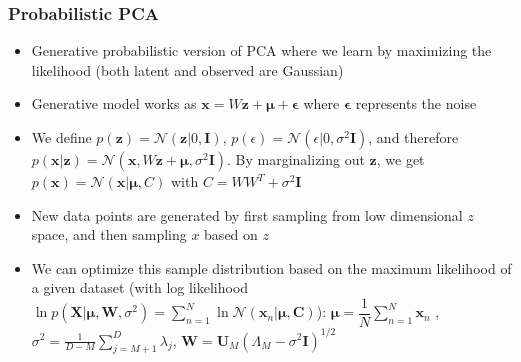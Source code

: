 \subsubsection{Probabilistic PCA}
\begin{itemize}
	\item Generative probabilistic version of PCA where we learn by maximizing the likelihood (both latent and observed are Gaussian)
	\item Generative model works as $\bm{x} = W\bm{z} + \bm{\mu} + \bm{\epsilon}$ where $\bm{\epsilon}$ represents the noise
	\item We define $p(\bm{z}) = \mathcal{N}(\bm{z}|0, \bm{I})$, $p(\epsilon) = \mathcal{N}(\epsilon|0, \sigma^2 \bm{I})$, and therefore $p(\bm{x}|\bm{z}) = \mathcal{N}(\bm{x}, W\bm{z} + \bm{\mu}, \sigma^2 \bm{I})$. By marginalizing out $\bm{z}$, we get $p(\bm{x}) = \mathcal{N}(\bm{x}|\bm{\mu}, C)$ with $C = WW^T + \sigma^2 \bm{I}$
	\item New data points are generated by first sampling from low dimensional $z$ space, and then sampling $x$ based on $z$
	\item We can optimize this sample distribution based on the maximum likelihood of a given dataset (with log likelihood $\ln p(\bm{X}|\bm{\mu},\bm{W},\sigma^2) = \sum_{n=1}^{N} \ln \mathcal{N}(\bm{x}_n|\bm{\mu},\bm{C})$): $\bm{\mu} = \dfrac{1}{N} \sum_{n=1}^{N} \bm{x}_n$ , $\sigma^2 = \frac{1}{D - M}\sum_{j=M+1}^{D} \lambda_j$, $\bm{W} = \bm{U}_M (\Lambda_M - \sigma^2 \bm{I})^{1/2}$
\end{itemize}
